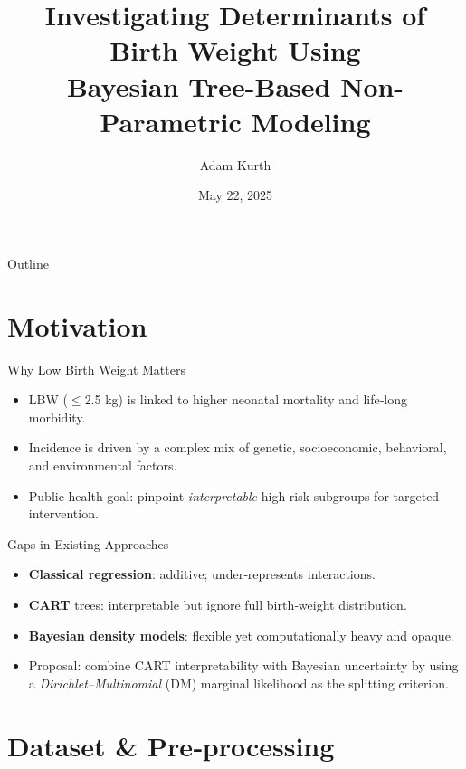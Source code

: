 \documentclass[aspectratio=169,professionalfonts]{beamer}
\title[Birth-Weight Modeling]{Investigating Determinants of Birth Weight Using\\Bayesian Tree-Based Non-Parametric Modeling}
\author[Kurth]{Adam Kurth}
\institute{School of Mathematical \& Statistical Sciences\\Arizona State University}
\date{May 22, 2025}
\begin{document}
\begin{frame}[plain]
  \titlepage
\end{frame}

\begin{frame}{Outline}
\tableofcontents
\end{frame}

\section{Motivation}


\begin{frame}{Why Low Birth Weight Matters}
\begin{itemize}
  \item LBW ($\le$2.5 kg) is linked to higher neonatal mortality and life‑long morbidity.
  \item Incidence is driven by a complex mix of genetic, socioeconomic, behavioral, and environmental factors.
  \item Public‑health goal: pinpoint \emph{interpretable} high‑risk subgroups for targeted intervention.
\end{itemize}
\end{frame}


\begin{frame}{Gaps in Existing Approaches}
\begin{itemize}
  \item \textbf{Classical regression}: additive; under‑represents interactions.
  \item \textbf{CART} trees: interpretable but ignore full birth‑weight distribution.
  \item \textbf{Bayesian density models}: flexible yet computationally heavy and opaque.
  \item Proposal: combine CART interpretability with Bayesian uncertainty by using a \emph{Dirichlet–Multinomial} (DM) marginal likelihood as the splitting criterion.
\end{itemize}
\end{frame}

\section{Dataset \& Pre‑processing}
\end{document}
